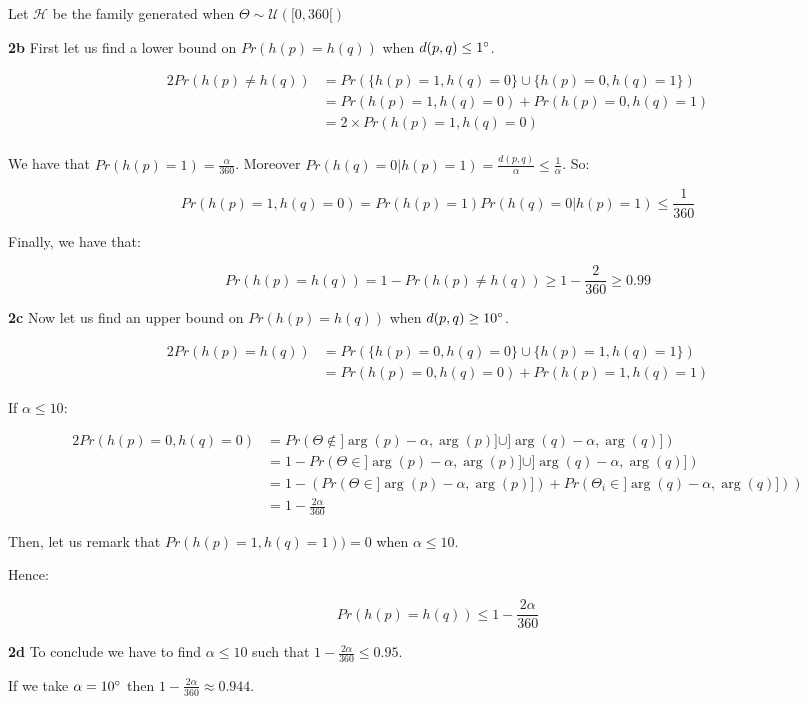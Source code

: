 \documentclass[10pt,a4paper]{article}
\theoremstyle{plain}
\begin{document}
Let $\mathcal{H}$ be the family generated when $\Theta \sim \mathcal{U}([0, 360[)$

\textbf{2b} First let us find a lower bound on $Pr(h(p) = h(q))$ when $d(p, q) \leq 1\degree$.

\begin{alignat*}{2}
Pr(h(p) \neq h(q)) & = Pr(\{h(p) = 1, h(q) = 0\} \cup \{h(p) = 0, h(q) = 1\}) \\
& = Pr(h(p) = 1, h(q) = 0) + Pr(h(p) = 0, h(q) = 1) \\
& = 2 \times Pr(h(p) = 1, h(q) = 0) \\
\end{alignat*}

We have that $Pr(h(p) = 1) = \frac{\alpha}{360}$. Moreover $Pr(h(q) = 0 | h(p) = 1) = \frac{d(p, q)}{\alpha} \leq \frac{1}{\alpha}$. So:

$$
Pr(h(p) = 1, h(q) = 0) = Pr(h(p) = 1)Pr(h(q) = 0 | h(p) = 1)\leq \frac{1}{360}
$$

Finally, we have that:

$$
Pr(h(p) = h(q)) = 1 - Pr(h(p) \neq h(q)) \geq 1 - \frac{2}{360} \geq 0.99
$$

\textbf{2c} Now let us find an upper bound on $Pr(h(p) = h(q))$ when $d(p, q) \geq 10\degree$.

\begin{alignat*}{2}
Pr(h(p) = h(q)) & = Pr(\{h(p) = 0, h(q) = 0\} \cup \{h(p) = 1, h(q) = 1\}) \\
& = Pr(h(p) = 0, h(q) = 0) + Pr(h(p) = 1, h(q) = 1)
\end{alignat*}

If $\alpha \leq 10$:

\begin{alignat*}{2}
Pr(h(p) = 0, h(q) = 0) & = Pr(\Theta \not \in ]\arg(p)-\alpha, \arg(p)] \cup ]\arg(q)-\alpha, \arg(q)]) \\
& = 1 - Pr(\Theta \in ]\arg(p)-\alpha, \arg(p)] \cup ]\arg(q)-\alpha, \arg(q)]) \\
& = 1 - (Pr(\Theta \in ]\arg(p)-\alpha, \arg(p)]) + Pr(\Theta_i \in ]\arg(q)-\alpha, \arg(q)])) \\
& = 1 - \frac{2\alpha}{360}
\end{alignat*}

Then, let us remark that $Pr(h(p) = 1, h(q) = 1)) = 0$ when $\alpha \leq 10$.

Hence:

$$
Pr(h(p) = h(q)) \leq 1 - \frac{2\alpha}{360}
$$

\textbf{2d} To conclude we have to find $\alpha \leq 10$ such that $1 - \frac{2\alpha}{360} \leq 0.95$.

If we take $\alpha = 10\degree$ then $1 - \frac{2\alpha}{360} \approx 0.944$.
\end{document}
